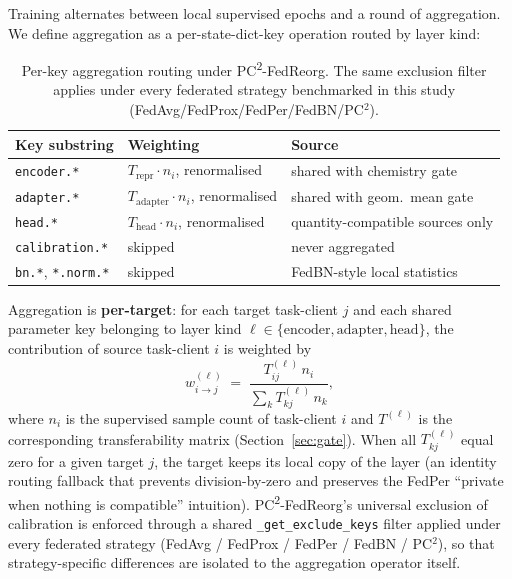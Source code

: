 \documentclass[11pt,a4paper]{article}
\newcommand{\PC}{PC\textsuperscript{2}-FedReorg}
\begin{document}
Training alternates between local supervised epochs and a round of aggregation. We define aggregation as a per-state-dict-key operation routed by layer kind:

\begin{table}[h]
\centering
\small
\caption{Per-key aggregation routing under \PC{}. The same exclusion filter applies under every federated strategy benchmarked in this study (FedAvg/FedProx/FedPer/FedBN/PC$^2$).}\label{tab:routing}
\begin{tabular}{@{}lll@{}}
\toprule
Key substring & Weighting & Source \\
\midrule
\texttt{encoder.*}      & $T_{\mathrm{repr}}\cdot n_i$, renormalised    & shared with chemistry gate \\
\texttt{adapter.*}      & $T_{\mathrm{adapter}}\cdot n_i$, renormalised & shared with geom.\ mean gate \\
\texttt{head.*}         & $T_{\mathrm{head}}\cdot n_i$, renormalised    & quantity-compatible sources only \\
\texttt{calibration.*}  & skipped                                       & never aggregated \\
\texttt{bn.*}, \texttt{*.norm.*} & skipped                              & FedBN-style local statistics~\citep{Li2021_FedBN} \\
\bottomrule
\end{tabular}
\end{table}

Aggregation is \textbf{per-target}: for each target task-client $j$ and each shared parameter key belonging to layer kind $\ell \in \{\mathrm{encoder},\mathrm{adapter},\mathrm{head}\}$, the contribution of source task-client $i$ is weighted by
\begin{equation}\label{eq:weights}
w_{i \to j}^{(\ell)} \;=\; \frac{T^{(\ell)}_{ij}\, n_i}{\sum_{k} T^{(\ell)}_{kj}\, n_k},
\end{equation}
where $n_i$ is the supervised sample count of task-client $i$ and $T^{(\ell)}$ is the corresponding transferability matrix (Section~\ref{sec:gate}). When all $T^{(\ell)}_{kj}$ equal zero for a given target $j$, the target keeps its local copy of the layer (an identity routing fallback that prevents division-by-zero and preserves the FedPer ``private when nothing is compatible'' intuition). \PC{}'s universal exclusion of calibration is enforced through a shared \verb|_get_exclude_keys| filter applied under every federated strategy (FedAvg / FedProx / FedPer / FedBN / PC$^2$), so that strategy-specific differences are isolated to the aggregation operator itself.
\end{document}

